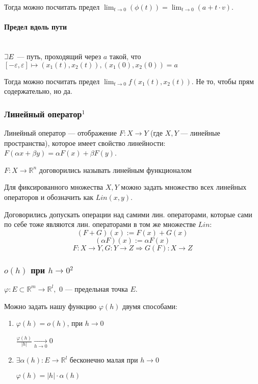 \documentclass{article}
\def\letus{%
\mathord{\setbox0=\hbox{$\exists$}%
         \hbox{\kern 0.125\wd0%
               \vbox to \ht0{%
                  \hrule width 0.75\wd0%
                  \vfill%
                  \hrule width 0.75\wd0}%
               \vrule height \ht0%
               \kern 0.125\wd0}%
       }%
        }
\let\vanillaparagraph\paragraph
\renewcommand{\paragraph}[1]{\vanillaparagraph{#1}\mbox{}\\}
\begin{document}
Тогда можно посчитать предел $\lim_{t\rightarrow 0}(\phi(t)) = \lim_{t\rightarrow 0}(a + t \cdot v)$. 

\paragraph{Предел вдоль пути}
$\letus E$ --- путь, проходящий через $a$ такой, что $[-\varepsilon, \varepsilon] \mapsto (x_1(t), x_2(t)), (x_1(0), x_2(0)) = a$

Тогда можно посчитать предел $\lim_{t\rightarrow 0} f(x_1(t), x_2(t))$. Не то, чтобы прям содержательно, но да.

\subsubsection{Линейный оператор\texorpdfstring{$^1$}{}}
Линейный оператор --- отображение $F: X \rightarrow Y$ (где $X, Y$ --- линейные пространства), которое имеет свойство линейности: $F(\alpha x + \beta y) = \alpha F(x) + \beta F(y)$.


$F: X \rightarrow \mathbb{R}^n$ договорились называть линейным функционалом

Для фиксированного множества $X, Y$ можно задать множество всех линейных операторов и обозначить как $Lin(x, y)$.

Договорились допускать операции над самими лин. операторами, которые сами по себе тоже являются лин. операторами в том же множестве $Lin$:
$$(F + G)(x) := F(x) + G(x)$$
$$(\alpha F)(x) := \alpha F(x)$$
$$F: X \rightarrow Y, G: Y \rightarrow Z \Rightarrow G(F): X \rightarrow Z$$


\subsubsection{\texorpdfstring{$o(h)$}{o(h)} при \texorpdfstring{$h \rightarrow 0$}{h -> 0}\texorpdfstring{$^2$}{}}

$\varphi : E \subset \mathbb{R}^m \rightarrow \mathbb{R}^l, $ 0 --- предельная точка $E$.

Можно задать нашу функцию $\varphi(h)$ двумя способами:
\begin{enumerate}
    \item $ \varphi(h)=o(h)$, при $ h \rightarrow 0 $
    
$ \frac{\varphi(h)}{|h|} \underset{h \rightarrow 0}{\longrightarrow} 0 $

    \item $ \exists \alpha(h) : E \rightarrow \mathbb{R}^l $ бесконечно малая при $ h \rightarrow 0 $
    
    $ \varphi(h)=|h| \cdot \alpha(h) $
\end{enumerate}
\end{document}

